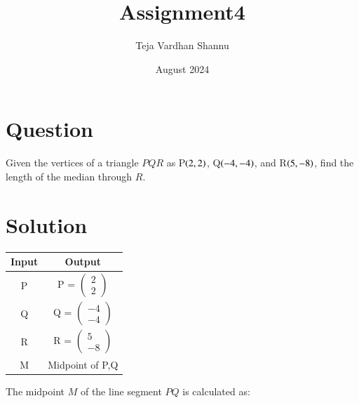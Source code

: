 \documentclass[journal]{IEEEtran}
\title{Assignment4}
\author{Teja Vardhan Shannu}
\date{August 2024}
\numberwithin{equation}{enumi}
\numberwithin{figure}{enumi}
\begin{document}
\maketitle

\section*{Question}
Given the vertices of a triangle \( PQR \) as P$\left(2,2\right)$, Q$\left(-4,-4\right)$, and R$\left(5,-8\right)$, find the length of the median through \( R \).

\section*{Solution}


\begin{table}[h!]

\centering    

\begin{tabular}{|c|c|}
\hline

Input & Output \\
\hline
P & {P} = $\begin{pmatrix} 2 \\ 2 \end{pmatrix}$ \\
Q & {Q} = $\begin{pmatrix} -4 \\ -4 \end{pmatrix}$\\
R & {R} = $\begin{pmatrix} 5 \\ -8 \end{pmatrix} $\\
M & Midpoint of P,Q    \\

\hline
\end{tabular}
\end{table}







The midpoint \( M \) of the line segment \( PQ \) is calculated as:
\end{document}
